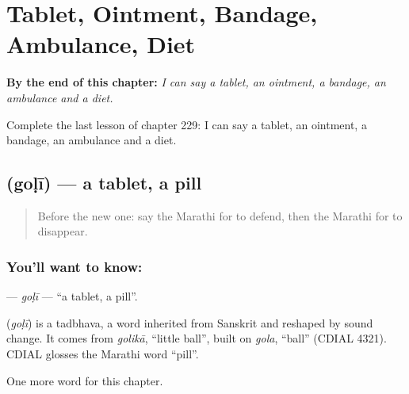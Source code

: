 
\chapter{Tablet, Ointment, Bandage, Ambulance, Diet}
\label{ch:mr-tablet-ointment-bandage-ambulance-diet}

\begin{chapteropening}
\textbf{By the end of this chapter:} \emph{I can say a tablet, an ointment, a bandage, an ambulance and a diet.}

Complete the last lesson of chapter 229: I can say a tablet, an ointment, a bandage, an ambulance and a diet.
\end{chapteropening}

\section[\texorpdfstring{\mr{गोळी} (goḷī)}{गोळी (goḷī)}]{ (goḷī) — a tablet, a pill}

\label{lesson:MR-C229-goli}



\begin{quote}
Before the new one: say the Marathi for to defend, then the Marathi for to disappear.
\end{quote}

\subsection*{You'll want to know: }
\textbf{} — \emph{goḷī} — \textquotedblleft{}a tablet, a pill\textquotedblright{}.

\begin{cousinweb}
\textbf{} (\emph{goḷī}) is a tadbhava, a word inherited from Sanskrit and reshaped by sound change. It comes from \emph{golikā}, \textquotedblleft{}little ball\textquotedblright{}, built on \emph{gola}, \textquotedblleft{}ball\textquotedblright{} (CDIAL 4321). CDIAL glosses the Marathi word \textquotedblleft{}pill\textquotedblright{}.
\end{cousinweb}

\begin{grammarlens}[title={What you've built}]
One more word for this chapter.
\end{grammarlens}

